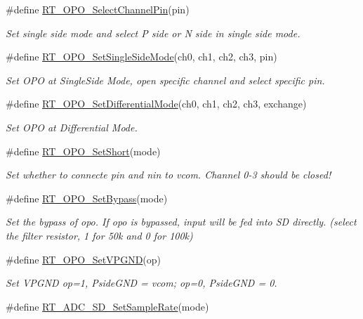 \begin{DoxyCompactItemize}
\#define \mbox{\hyperlink{a00002_aaa7081959e37104e40e3f637d42d5144}{R\+T\+\_\+\+O\+P\+O\+\_\+\+Select\+Channel\+Pin}}(pin)
\begin{DoxyCompactList}\small\item\em Set single side mode and select P side or N side in single side mode. \end{DoxyCompactList}\item 
\#define \mbox{\hyperlink{a00002_a6438defc0d6280f2b5baedc039f2e314}{R\+T\+\_\+\+O\+P\+O\+\_\+\+Set\+Single\+Side\+Mode}}(ch0,  ch1,  ch2,  ch3,  pin)
\begin{DoxyCompactList}\small\item\em Set O\+PO at Single\+Side Mode, open specific channel and select specific pin. \end{DoxyCompactList}\item 
\#define \mbox{\hyperlink{a00002_aadbc9c89735814445f0dc8d4b4eb3e54}{R\+T\+\_\+\+O\+P\+O\+\_\+\+Set\+Differential\+Mode}}(ch0,  ch1,  ch2,  ch3,  exchange)
\begin{DoxyCompactList}\small\item\em Set O\+PO at Differential Mode. \end{DoxyCompactList}\item 
\#define \mbox{\hyperlink{a00002_aef61e41bd9fb19c3690ff5a25fb9893d}{R\+T\+\_\+\+O\+P\+O\+\_\+\+Set\+Short}}(mode)
\begin{DoxyCompactList}\small\item\em Set whether to connecte pin and nin to vcom. Channel 0-\/3 should be closed! \end{DoxyCompactList}\item 
\#define \mbox{\hyperlink{a00002_a3297280ab870eae12b918351e111819a}{R\+T\+\_\+\+O\+P\+O\+\_\+\+Set\+Bypass}}(mode)
\begin{DoxyCompactList}\small\item\em Set the bypass of opo. If opo is bypassed, input will be fed into SD directly. (select the filter resistor, 1 for 50k and 0 for 100k) \end{DoxyCompactList}\item 
\#define \mbox{\hyperlink{a00002_a92d5325c171f6afbf19fe0002ef5296d}{R\+T\+\_\+\+O\+P\+O\+\_\+\+Set\+V\+P\+G\+ND}}(op)
\begin{DoxyCompactList}\small\item\em Set V\+P\+G\+ND op=1, Pside\+G\+ND = vcom; op=0, Pside\+G\+ND = 0. \end{DoxyCompactList}\item 
\#define \mbox{\hyperlink{a00002_a246ce987fa2b9f254f4796340eb23ed0}{R\+T\+\_\+\+A\+D\+C\+\_\+\+S\+D\+\_\+\+Set\+Sample\+Rate}}(mode)

\end{DoxyCompactItemize}
